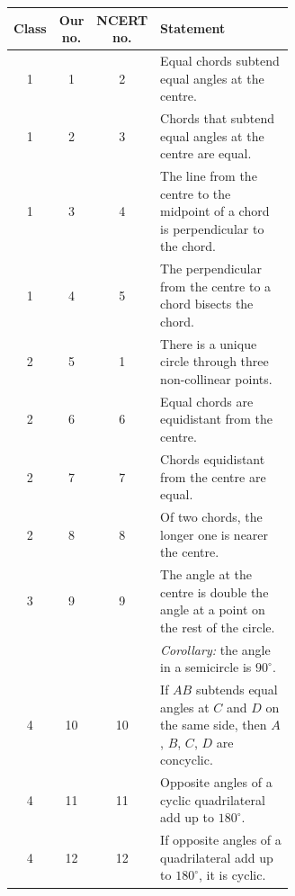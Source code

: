 \begin{center}
\renewcommand{\arraystretch}{1.25}
\begin{tabular}{|c|c|c|p{0.62\linewidth}|}\hline
\textbf{Class} & \textbf{Our no.} & \textbf{NCERT no.} & \textbf{Statement}\\ \hline
1 & 1 & 2 & Equal chords subtend equal angles at the centre.\\ \hline
1 & 2 & 3 & Chords that subtend equal angles at the centre are equal.\\ \hline
1 & 3 & 4 & The line from the centre to the midpoint of a chord is perpendicular to the chord.\\ \hline
1 & 4 & 5 & The perpendicular from the centre to a chord bisects the chord.\\ \hline
2 & 5 & 1 & There is a unique circle through three non-collinear points.\\ \hline
2 & 6 & 6 & Equal chords are equidistant from the centre.\\ \hline
2 & 7 & 7 & Chords equidistant from the centre are equal.\\ \hline
2 & 8 & 8 & Of two chords, the longer one is nearer the centre.\\ \hline
3 & 9 & 9 & The angle at the centre is double the angle at a point on the rest of the circle.\\
 & & & \emph{Corollary:} the angle in a semicircle is $90^\circ$.\\ \hline
4 & 10 & 10 & If $AB$ subtends equal angles at $C$ and $D$ on the same side, then $A$, $B$, $C$, $D$ are concyclic.\\ \hline
4 & 11 & 11 & Opposite angles of a cyclic quadrilateral add up to $180^\circ$.\\ \hline
4 & 12 & 12 & If opposite angles of a quadrilateral add up to $180^\circ$, it is cyclic.\\ \hline
\end{tabular}
\end{center}
